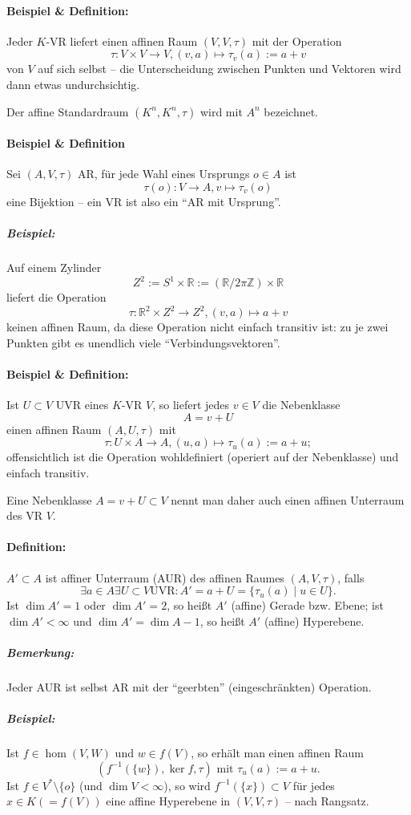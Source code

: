 \paragraph{Beispiel \& Definition: }
	Jeder $ K $-VR liefert einen affinen Raum $ (V,V,\tau) $ mit der Operation
		\[ \tau: V\times V\to V, (v,a)\mapsto \tau_v(a):= a+v \]
	von $ V $ auf sich selbst -- die Unterscheidung zwischen Punkten und Vektoren wird dann etwas undurchsichtig.
	
	Der affine Standardraum $ (K^n,K^n,\tau) $ wird mit $ A^n $ bezeichnet.
\paragraph{Beispiel \& Definition}
	Sei $ (A,V,\tau) $ AR, für jede Wahl eines Ursprungs $ o\in A $ ist
		\[ \tau(o) :V\to A,v\mapsto \tau_v(o) \]
	eine Bijektion -- ein VR ist also ein "`AR mit Ursprung"'.
	
\subparagraph{Beispiel: }
	Auf einem Zylinder
	\[ Z^2 := S^1\times \mathbb{R}:= (\mathbb{R}/2\pi\mathbb{Z})\times \mathbb{R} \]
	liefert die Operation
		\[ \tau:\mathbb{R}^2\times Z^2\to Z^2,(v,a)\mapsto a+v \]
	keinen affinen Raum, da diese Operation nicht einfach transitiv ist: zu je zwei Punkten gibt es unendlich viele "`Verbindungsvektoren"'.
\paragraph{Beispiel \& Definition: }
	Ist $ U\subset V $ UVR eines $ K $-VR $ V $, so liefert jedes $ v\in V $ die Nebenklasse
		\[ A = v+U \]
	einen affinen Raum $ (A,U,\tau) $ mit 
		\[ \tau:U\times A\to A,(u,a)\mapsto \tau_u(a):= a+u; \]
	offensichtlich ist die Operation wohldefiniert (operiert auf der Nebenklasse) und einfach transitiv.
	
	Eine Nebenklasse $ A= v+U\subset V $ nennt man daher auch einen affinen Unterraum des VR $ V $.
\paragraph{Definition: }
	$ A'\subset A $ ist affiner Unterraum (AUR) des affinen Raumes $ (A,V,\tau) $, falls
		\[ \exists a\in A\exists U\subset V \text{UVR}:A' = a+U = \{\tau_u(a)\mid u\in U\}.\]
	Ist $ \dim A' =1 $ oder $ \dim A' = 2 $, so heißt $ A' $ (affine) Gerade bzw. Ebene; ist $ \dim A' < \infty $ und $ \dim A' = \dim A-1 $, so heißt $ A' $ (affine) Hyperebene.
\subparagraph{Bemerkung: }
	Jeder AUR ist selbst AR mit der "`geerbten"' (eingeschränkten) Operation.
\subparagraph{Beispiel: }
	Ist $ f\in \hom(V,W) $ und $ w\in f(V) $, so erhält man einen affinen Raum
		\[ (f^{-1}(\{w\}),\ker f,\tau) \text{ mit }\tau_u(a):= a+u.\]
	Ist $ f\in V^*\setminus \{o\} $ (und $ \dim V<\infty $), so wird $ f^{-1}(\{x\})\subset V $ für jedes $ x\in K (=f(V)) $ eine affine Hyperebene in $ (V,V,\tau) $ -- nach Rangsatz.